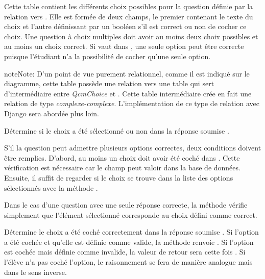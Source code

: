 \documentclass[a4,10pt,french]{sphinxmanual}
\begin{document}
\begin{fulllineitems}
\label{database:quiz.models.QcmChoice}
Cette table contient les différents choix possibles pour la question définie
par la relation vers . Elle est formée de deux champs, le premier contenant
le texte du choix et l'autre définissant par un booléen s'il est correct ou
non de cocher ce choix. Une question à choix multiples doit avoir au moins
deux choix possibles et au moins un choix correct. Si  vaut
 dans , une seule option peut être correcte puisque l'étudiant
n'a la possibilité de cocher qu'une seule option.

\begin{notice}{note}{Note:}
D'un point de vue purement relationnel, comme il est indiqué sur
le diagramme, cette table possède une relation vers une table qui sert
d'intermédiaire entre \emph{QcmChoice} et . Cette table intermédiaire
crée en fait une relation de type \emph{complexe-complexe}. L'implémentation de ce
type de relation avec Django sera abordée plus loin.
\end{notice}

\begin{fulllineitems}
\label{database:quiz.models.QcmChoice.checked}
Détermine si le choix a été sélectionné ou non dans la réponse soumise
.

S'il la question peut admettre plusieurs options correctes, deux conditions doivent
être remplies. D'abord, au moins un choix doit avoir été coché dans .
Cette vérification est nécessaire car le champ  peut
valoir  dans la base de données. Ensuite, il suffit de regarder
si le choix se trouve dans la liste des options sélectionnés avec la méthode
.

Dans le cas d'une question avec une seule réponse correcte, la méthode
vérifie simplement que l'élément sélectionné corresponde au choix défini comme
correct.

\end{fulllineitems}


\begin{fulllineitems}
\label{database:quiz.models.QcmChoice.correct_submit}
Détermine le choix  a été coché correctement dans la réponse
soumise . Si l'option a été cochée et qu'elle est définie
comme valide, la méthode renvoie . Si l'option est cochée mais
définie comme invalide, la valeur de retour sera cette fois .
Si l'élève n'a pas coché l'option, le raisonnement se fera de manière analogue
mais dans le sens inverse.


\end{fulllineitems}
\end{fulllineitems}
\end{document}
